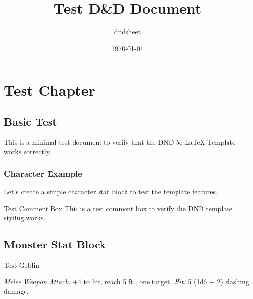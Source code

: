 \documentclass[letterpaper,twocolumn,openany]{dndbook}
\title{Test D\&D Document}
\author{dndsheet}
\date{\today}
\begin{document}
\maketitle

\chapter{Test Chapter}

\section{Basic Test}

This is a minimal test document to verify that the DND-5e-LaTeX-Template works correctly.

\subsection{Character Example}

Let's create a simple character stat block to test the template features.

\begin{DndComment}{Test Comment Box}
    This is a test comment box to verify the DND template styling works.
\end{DndComment}

\section{Monster Stat Block}

\begin{DndMonster}{Test Goblin}

    \DndMonsterBasics[
        armor-class = {15 (leather armor, shield)},
        hit-points  = {\DndDice{2d6}},
        speed       = {30 ft.},
    ]

    \DndMonsterAbilityScores[
        str = 8,
        dex = 14,
        con = 10,
        int = 10,
        wis = 8,
        cha = 8,
    ]

    \DndMonsterDetails[
        senses = {darkvision 60 ft., passive Perception 9},
        languages = {Common, Goblin},
        challenge = {1/4},
    ]

    \emph{Melee Weapon Attack:} +4 to hit, reach 5 ft., one target.
    \emph{Hit:} 5 (1d6 + 2) slashing damage.
\end{DndMonster}
\end{document}
